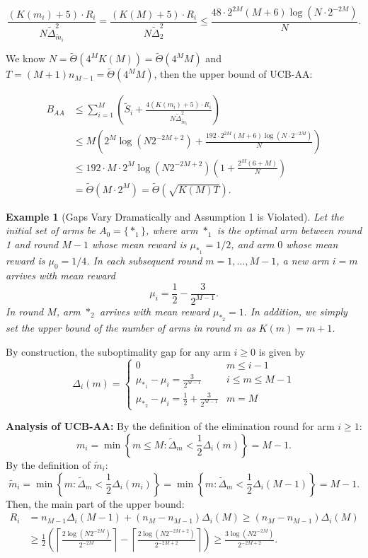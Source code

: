 \documentclass[
  12pt]{article}
\newtheorem{example}{Example}
\begin{document}
$$ \frac{(K(m_i)+5)\cdot R_i}{N\tilde{\Delta}_{\tilde{m}_i}^2} = \frac{(K(M)+5)\cdot R_i}{N\tilde{\Delta}_{2}^2}\leq \frac{48\cdot 2^{2M}(M+6)\log (N \cdot 2^{-2M})}{N} .$$

We know $N=\tilde{\Theta}(4^MK(M))=\tilde{\Theta}(4^MM)$ and $T = (M+1)n_{M-1}=\tilde{\Theta}(4^MM)$, then the upper bound of UCB-AA:

$$\begin{aligned}
B_{AA} &\le  \sum_{i=1}^{M}   \left( \tilde{S}_i+\frac{4\left(K(m_i)+5\right)\cdot R_i}{N\tilde{\Delta}_{\tilde{m}_i}^2}\right) \\
&\le  M \left( 2^{M} \log(N 2^{-2M+2})+\frac{192\cdot  2^{2M}(M+6)\log (N \cdot 2^{-2M})}{N}\right)\\
&\le 192\cdot M \cdot  2^{M} \log(N 2^{-2M+2})\left(1+\frac{2^M(6+M)}{N}\right) \\
& = \tilde{\Theta }\left( M \cdot  2^{M} \right) = \tilde{\Theta }\left(  \sqrt{K(M)T} \right).
\end{aligned}$$





\begin{example}[Gaps Vary Dramatically and Assumption 1 is Violated]
\label{Example 5}
Let the initial set of arms be $A_0 = \{*_1\}$, where arm $*_1$ is the optimal arm between round 1 and round $M-1$ whose mean reward is $\mu_{*_1} = 1/2$, and arm $0$ whose mean reward is $\mu_0 = 1/4$. In each subsequent round $m=1, \dots, M-1$, a new arm $i=m$ arrives with mean reward 
$$\mu_i = \frac{1}{2} - \frac{3}{2^{M-1}}.$$ In round $M$, arm $*_2$ arrives with mean reward $\mu_{*_2} =1.$
In addition, we simply set the upper bound of the number of arms in round $m$ as $K(m)=m+1$.
\end{example}

By construction, the suboptimality gap for any arm $i \ge 0$ is given by 
\[\Delta_i(m)=\begin{cases}
      0        & m\leq i-1\\
    \mu_{*_1} - \mu_i = \frac{3}{2^{M-1}}  & i\leq m\leq M-1\\
    \mu_{*_2} - \mu_i = \frac{1}{2} +\frac{3}{2^{M-1}}&m=M 
\end{cases}\]


\textbf{Analysis of UCB-AA:} 
By the definition of the elimination round for arm $i \geq1$:
$$m_i = \min \left\{ m \leq M : \tilde{\Delta}_m < \frac{1}{2}\Delta_i(m) \right\}=M-1.$$
By the definition of $\tilde{m}_i$:
$$ \tilde{m}_{i} = \min\left\{ m: \tilde{\Delta}_{m} < \frac{1}{2}\Delta_{i}(m_i) \right\}=\min\left\{ m: \tilde{\Delta}_{m} < \frac{1}{2}\Delta_{i}(M-1) \right\}=M-1.$$
Then, the main part of the upper bound: 
\begin{align*}
    R_i &= n_{M-1}\Delta_i(M-1)+(n_{M} -n_{M-1})\Delta_i(M) \geq  (n_{M} -n_{M-1})\Delta_i(M) \\
     &\geq \frac{1}{2} \left(\left\lceil \frac{2 \log(N 2^{-2M})}{2^{-2M}} \right\rceil  - \left\lceil \frac{2 \log(N 2^{-2M+2})}{2^{-2M+2}} \right\rceil \right) \geq  \frac{ 3\log(N 2^{-2M})}{2^{-2M+2}} .
\end{align*}
\end{document}
